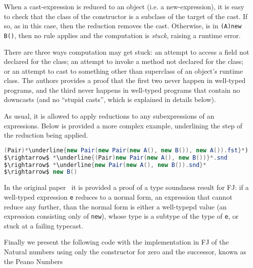 When a cast-expression is reduced to an object (i.e. a new-expression), it is
easy to check that the class of the constructor is a subclass of the target of
the cast. If so, as in this case, then the reduction removes the cast.
Otherwise, is in \texttt{(A)new B()}, then no rule applies and the computation
is \textit{stuck}, raising a runtime error.

There are three ways computation may get stuck: an attempt to access a field
not declared for the class; an attempt to invoke a method not declared for the
class; or an attempt to cast to something other than superclass of an object's
runtime class. The authors provides a proof that the first two never happen in
well-typed programs, and the third never happens in well-typed programs that
contain no downcasts (and no ``stupid casts'', which is explained in details
below).

As usual, it is allowed to apply reductions to any subexpressions of an
expressions. Below is provided a more complex example, underlining the step of
the reduction being applied.
\begin{lstlisting}[language=Java, mathescape = true, escapechar = \*]
   (Pair)*\underline{new Pair(new Pair(new A(), new B()), new A()).fst}*).snd
$\rightarrow$ *\underline{(Pair)new Pair(new A(), new B())}*.snd
$\rightarrow$ *\underline{new Pair(new A(), new B()).snd}*
$\rightarrow$ new B()
\end{lstlisting}

In the original paper~\cite{Igarashi99featherweightjava} it is provided a proof
of a type soundness result for FJ: if a well-typed expression \texttt{e}
reduces to a normal form, an expression that cannot reduce any further, than
the normal form is either a well-typepd value (an expression consisting only of
\texttt{new}), whose type is a subtype of the type of \texttt{e}, or stuck at a
failing typecast.

Finally we present the following code with the implementation in FJ of the
Natural numbers using only the constructor for zero and the successor, known as
the Peano Numbers~\cite{Peano1889}


